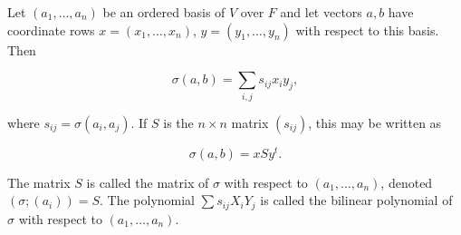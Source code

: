 Let $(a_1, \ldots, a_n)$ be an ordered basis of $V$ over $F$ and let vectors $a, b$ have coordinate rows $x = (x_1, \ldots, x_n)$, $y = (y_1, \ldots, y_n)$ with respect to this basis. Then

$$\sigma(a, b) = \sum_{i,j} s_{ij} x_i y_j,$$

where $s_{ij} = \sigma(a_i, a_j)$. If $S$ is the $n \times n$ matrix $(s_{ij})$, this may be written as

$$\sigma(a, b) = x S y^t.$$

The matrix $S$ is called the matrix of $\sigma$ with respect to $(a_1, \ldots, a_n)$, denoted $(\sigma; (a_i)) = S$. The polynomial $\sum s_{ij} X_i Y_j$ is called the bilinear polynomial of $\sigma$ with respect to $(a_1, \ldots, a_n)$.
